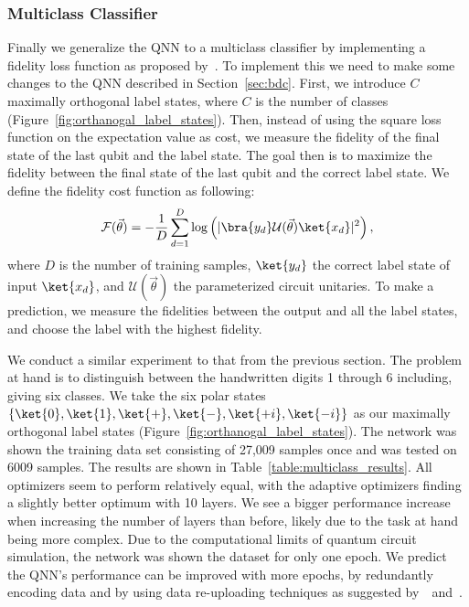 \documentclass[a4paper,10pt]{article}
\begin{document}
\subsubsection{Multiclass Classifier} \label{sec:multiclass_classifier}
Finally we generalize the QNN to a multiclass classifier by implementing a fidelity loss function as proposed by~\textcite{perez2019data}.
To implement this we need to make some changes to the QNN described in Section~\ref{sec:bdc}.
First, we introduce $C$ maximally orthogonal label states, where $C$ is the number of classes (Figure~\ref{fig:orthanogal_label_states}).
Then, instead of using the square loss function on the expectation value as cost, we measure the fidelity of the final state of the last qubit and the label state.
The goal then is to maximize the fidelity between the final state of the last qubit and the correct label state.
We define the fidelity cost function as following:
\begin{equation}
\mathcal{F}(\vec{\theta}) = - \dfrac{1}{D} \sum_{d=1}^{D} \log \left( \lvert \bra{y_d}\mathcal{U}(\vec{\theta})\ket{x_d} \rvert^2\right),
\end{equation}
where $D$ is the number of training samples, $\ket{y_d}$ the correct label state of input $\ket{x_d}$, and $\mathcal{U}(\vec{\theta})$ the parameterized circuit unitaries.
To make a prediction, we measure the fidelities between the output and all the label states, and choose the label with the highest fidelity.

We conduct a similar experiment to that from the previous section.
The problem at hand is to distinguish between the handwritten digits 1 through 6 including, giving six classes.
We take the six polar states $\{\ket{0}, \ket{1}, \ket{+}, \ket{-}, \ket{+i}, \ket{-i}\}$ as our maximally orthogonal label states (Figure~\ref{fig:orthanogal_label_states}).
The network was shown the training data set consisting of 27,009 samples once and was tested on 6009 samples.
The results are shown in Table~\ref{table:multiclass_results}.
All optimizers seem to perform relatively equal, with the adaptive optimizers finding a slightly better optimum with 10 layers.
We see a bigger performance increase when increasing the number of layers than before, likely due to the task at hand being more complex.
Due to the computational limits of quantum circuit simulation, the network was shown the dataset for only one epoch.
We predict the QNN's performance can be improved with more epochs, by redundantly encoding data and by using data re-uploading techniques as suggested by~\textcite{vidal2019input}~and~\textcite{perez2019data}.
\end{document}
